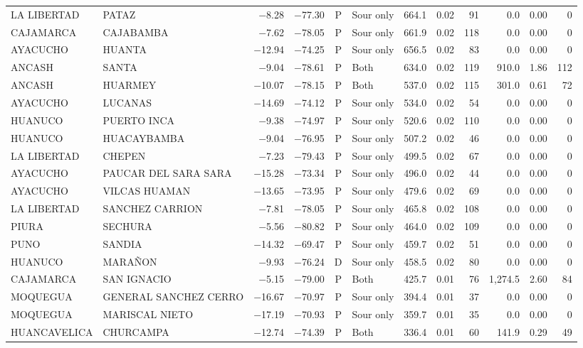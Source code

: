 \begin{landscape}
\begin{longtable}{llrrclrrrrrr}
LA LIBERTAD & PATAZ & $-$8.28 & $-$77.30 & P & Sour only & 664.1 & 0.02 & 91 & 0.0 & 0.00 & 0 \\
CAJAMARCA & CAJABAMBA & $-$7.62 & $-$78.05 & P & Sour only & 661.9 & 0.02 & 118 & 0.0 & 0.00 & 0 \\
AYACUCHO & HUANTA & $-$12.94 & $-$74.25 & P & Sour only & 656.5 & 0.02 & 83 & 0.0 & 0.00 & 0 \\
ANCASH & SANTA & $-$9.04 & $-$78.61 & P & Both & 634.0 & 0.02 & 119 & 910.0 & 1.86 & 112 \\
ANCASH & HUARMEY & $-$10.07 & $-$78.15 & P & Both & 537.0 & 0.02 & 115 & 301.0 & 0.61 & 72 \\
AYACUCHO & LUCANAS & $-$14.69 & $-$74.12 & P & Sour only & 534.0 & 0.02 & 54 & 0.0 & 0.00 & 0 \\
HUANUCO & PUERTO INCA & $-$9.38 & $-$74.97 & P & Sour only & 520.6 & 0.02 & 110 & 0.0 & 0.00 & 0 \\
HUANUCO & HUACAYBAMBA & $-$9.04 & $-$76.95 & P & Sour only & 507.2 & 0.02 & 46 & 0.0 & 0.00 & 0 \\
LA LIBERTAD & CHEPEN & $-$7.23 & $-$79.43 & P & Sour only & 499.5 & 0.02 & 67 & 0.0 & 0.00 & 0 \\
AYACUCHO & PAUCAR DEL SARA SARA & $-$15.28 & $-$73.34 & P & Sour only & 496.0 & 0.02 & 44 & 0.0 & 0.00 & 0 \\
AYACUCHO & VILCAS HUAMAN & $-$13.65 & $-$73.95 & P & Sour only & 479.6 & 0.02 & 69 & 0.0 & 0.00 & 0 \\
LA LIBERTAD & SANCHEZ CARRION & $-$7.81 & $-$78.05 & P & Sour only & 465.8 & 0.02 & 108 & 0.0 & 0.00 & 0 \\
PIURA & SECHURA & $-$5.56 & $-$80.82 & P & Sour only & 464.0 & 0.02 & 109 & 0.0 & 0.00 & 0 \\
PUNO & SANDIA & $-$14.32 & $-$69.47 & P & Sour only & 459.7 & 0.02 & 51 & 0.0 & 0.00 & 0 \\
HUANUCO & MARAÑON & $-$9.93 & $-$76.24 & D & Sour only & 458.5 & 0.02 & 80 & 0.0 & 0.00 & 0 \\
CAJAMARCA & SAN IGNACIO & $-$5.15 & $-$79.00 & P & Both & 425.7 & 0.01 & 76 & 1,274.5 & 2.60 & 84 \\
MOQUEGUA & GENERAL SANCHEZ CERRO & $-$16.67 & $-$70.97 & P & Sour only & 394.4 & 0.01 & 37 & 0.0 & 0.00 & 0 \\
MOQUEGUA & MARISCAL NIETO & $-$17.19 & $-$70.93 & P & Sour only & 359.7 & 0.01 & 35 & 0.0 & 0.00 & 0 \\
HUANCAVELICA & CHURCAMPA & $-$12.74 & $-$74.39 & P & Both & 336.4 & 0.01 & 60 & 141.9 & 0.29 & 49 \\

\end{longtable}
\end{landscape}
